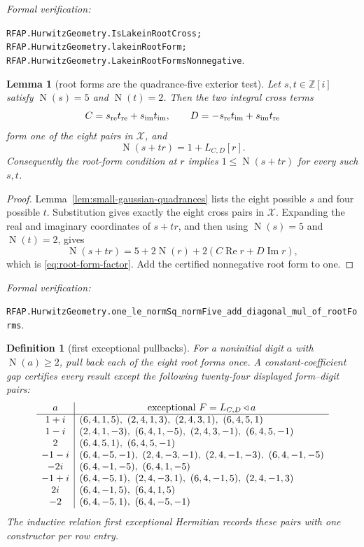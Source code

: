 \documentclass[11pt]{article}
\newtheorem{lemma}[lemma]{Lemma}
\newtheorem{definition}[definition]{Definition}
\newcommand{\Zi}{\mathbb{Z}[i]}
\newcommand{\Norm}[1]{\operatorname{N}\!\left(#1\right)}
\newcommand{\leanref}[1]{\par\smallskip\noindent
  \emph{Formal verification:}\par\nobreak
  {\raggedright\nolinkurl{#1}.\par}}
\begin{document}
\leanref{RFAP.HurwitzGeometry.IsLakeinRootCross;
RFAP.HurwitzGeometry.lakeinRootForm;
RFAP.HurwitzGeometry.LakeinRootFormsNonnegative}

\begin{lemma}[root forms are the quadrance-five exterior test]
\label{lem:root-form-exterior}
Let $s,t\in\Zi$ satisfy $\Norm s=5$ and $\Norm t=2$.  Then the two integral
cross terms
\[
 C=s_{\rm re}t_{\rm re}+s_{\rm im}t_{\rm im},
 \qquad
 D=-s_{\rm re}t_{\rm im}+s_{\rm im}t_{\rm re}
\]
form one of the eight pairs in $\mathcal X$, and
\begin{equation}
\label{eq:root-form-factor}
                       \Norm{s+tr}=1+L_{C,D}[r].
\end{equation}
Consequently the root-form condition at $r$ implies
$1\le\Norm{s+tr}$ for every such $s,t$.
\end{lemma}

\begin{proof}
Lemma~\ref{lem:small-gaussian-quadrances} lists the eight possible $s$ and
four possible $t$.  Substitution gives exactly the eight cross pairs in
$\mathcal X$.  Expanding the real and imaginary coordinates of $s+tr$, and
then using $\Norm s=5$ and $\Norm t=2$, gives
\[
 \Norm{s+tr}=5+2\Norm r
      +2(C\operatorname{Re}r+D\operatorname{Im}r),
\]
which is \eqref{eq:root-form-factor}.  Add the certified nonnegative root
form to one.
\end{proof}

\leanref{RFAP.HurwitzGeometry.one_le_normSq_normFive_add_diagonal_mul_of_rootForms}

\begin{definition}[first exceptional pullbacks]
\label{def:first-exceptional-hermitian}
For a noninitial digit $a$ with $\Norm a\ge2$, pull back each of the eight
root forms once.  A constant-coefficient gap certifies every result except
the following twenty-four displayed form--digit pairs:
\[
\begin{array}{c|l}
a & \multicolumn{1}{c}{\text{exceptional }F=L_{C,D}\mathbin{\triangleleft}a}
\\ \hline
 1+i &(6,4,1,5),\ (2,4,1,3),\ (2,4,3,1),\ (6,4,5,1)\\
 1-i &(2,4,1,-3),\ (6,4,1,-5),\ (2,4,3,-1),\ (6,4,5,-1)\\
 2   &(6,4,5,1),\ (6,4,5,-1)\\
-1-i &(6,4,-5,-1),\ (2,4,-3,-1),\ (2,4,-1,-3),\ (6,4,-1,-5)\\
-2i  &(6,4,-1,-5),\ (6,4,1,-5)\\
-1+i &(6,4,-5,1),\ (2,4,-3,1),\ (6,4,-1,5),\ (2,4,-1,3)\\
 2i  &(6,4,-1,5),\ (6,4,1,5)\\
-2   &(6,4,-5,1),\ (6,4,-5,-1)
\end{array}
\]
The inductive relation \emph{first exceptional Hermitian} records these
pairs with one constructor per row entry.
\end{definition}
\end{document}
